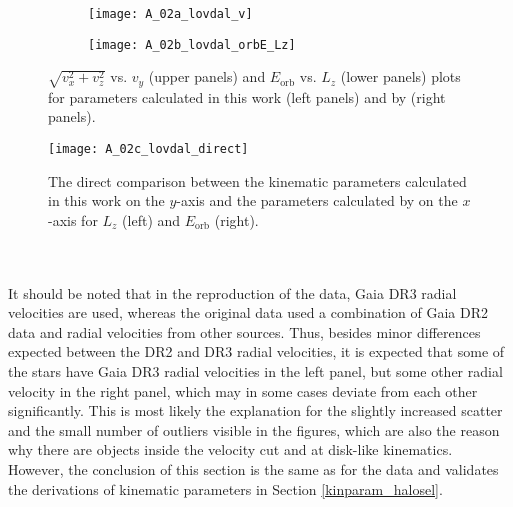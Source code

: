 \documentclass[a4paper,11pt]{article}
\begin{document}
%
\begin{figure}[ht]
 \centering
 \begin{subfigure}[t]{0.7\textwidth}
  \texttt{[image: A\_02a\_lovdal\_v]}
 \end{subfigure}
 \medskip
 \begin{subfigure}[t]{0.7\textwidth}
  \texttt{[image: A\_02b\_lovdal\_orbE\_Lz]}
 \end{subfigure}
 \caption[Reproduction of Lövdal et al. (2022) kinematic parameters]{$\sqrt{v_x^2+v_z^2}$ vs. $v_y$ (upper panels) and $E_\mathrm{orb}$ vs. $L_z$ (lower panels) plots for parameters calculated in this work (left panels) and by \citet{lovdal22} (right panels).}
 \label{fig:lovdal_v_orbE_Lz}
\end{figure}
%
\begin{figure}[ht]
 \centering
 \texttt{[image: A\_02c\_lovdal\_direct]}
 \caption[Direct comparison of kinematic parameters to Lövdal et al. (2022)]{The direct comparison between the kinematic parameters calculated in this work on the $y$-axis and the parameters calculated by \citet{lovdal22} on the $x$-axis for $L_z$ (left) and $E_\mathrm{orb}$ (right).}
 \label{fig:lovdal_direct}
\end{figure}\\ \\
%
It should be noted that in the reproduction of the data, Gaia DR3 radial velocities are used, whereas the original data used a combination of Gaia DR2 data and radial velocities from other sources. Thus, besides minor differences expected between the DR2 and DR3 radial velocities, it is expected that some of the stars have Gaia DR3 radial velocities in the left panel, but some other radial velocity in the right panel, which may in some cases deviate from each other significantly. This is most likely the explanation for the slightly increased scatter and the small number of outliers visible in the figures, which are also the reason why there are objects inside the velocity cut and at disk-like kinematics. However, the conclusion of this section is the same as for the \citet{helmi18} data and validates the derivations of kinematic parameters in Section \ref{kinparam_halosel}.
%
\end{document}
